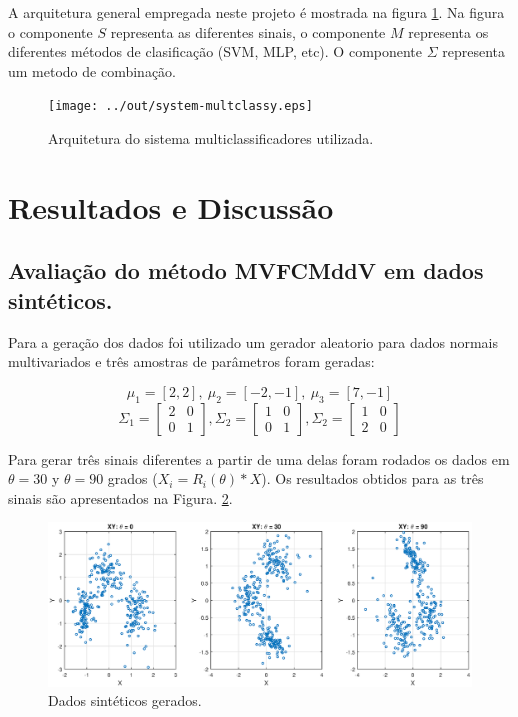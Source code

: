 \documentclass[12pt]{article}
\begin{document}
A arquitetura general empregada neste projeto é mostrada na figura \ref{fig:mult_system_classy}. Na figura o componente $S$ representa as diferentes sinais, o componente $M$ representa os diferentes métodos de clasificação (SVM, MLP, etc). O componente $\Sigma$ representa um metodo de combinação.  

\begin{figure}[h]
\centering
\texttt{[image: ../out/system-multclassy.eps]}
\caption{Arquitetura do sistema multiclassificadores utilizada.}
\label{fig:mult_system_classy}
\end{figure}  



\section{Resultados e Discussão}\label{RD}

\subsection{Avaliação do método MVFCMddV em dados sintéticos.}
Para a geração dos dados foi utilizado um gerador aleatorio para dados normais multivariados e três amostras de parâmetros  foram geradas:

$$\mu_1 = [2, 2], \ \mu_2 = [-2, -1], \ \mu_3 = [7, -1] $$
$$\Sigma_1 = \left[ \begin{matrix}
2 & 0 \\ 
0 & 1
\end{matrix} \right], 
\Sigma_2 = \left[ \begin{matrix}
1 & 0 \\ 
0 & 1
\end{matrix} \right], 
\Sigma_2 = \left[ \begin{matrix}
1 & 0 \\ 
2 & 0
\end{matrix} \right] $$

Para gerar três sinais diferentes a partir de uma delas foram rodados os dados em $\theta = 30$ y $\theta = 90$ grados ($X_i = R_i(\theta)*X$). Os resultados obtidos para as três sinais são apresentados na Figura. \ref{fig:xy_sinteticos}.

\begin{figure}[h]
\centering
\includegraphics[width=4.5in]{../out/xy-sinteticos.eps}
\caption{Dados sintéticos gerados.}
\label{fig:xy_sinteticos}
\end{figure}  
\end{document}
